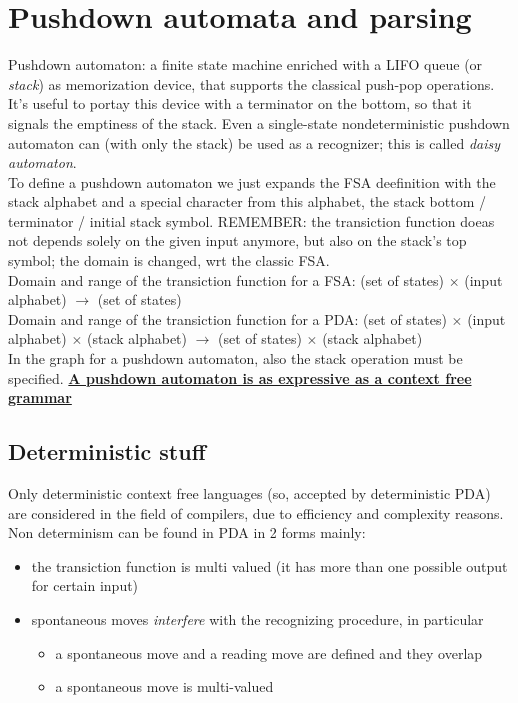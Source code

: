 \chapter{Pushdown automata and parsing}
	Pushdown automaton: a finite state machine enriched with a LIFO queue (or \emph{stack}) as memorization device, that supports the classical push-pop operations. It's useful to portay this device with a terminator on the bottom, so that it signals the emptiness of the stack. Even a single-state nondeterministic pushdown automaton can (with only the stack) be used as a recognizer; this is called \emph{daisy automaton}.\\
	To define a pushdown automaton we just expands the FSA deefinition with the stack alphabet and a special character from this alphabet, the stack bottom / terminator / initial stack symbol. REMEMBER: the transiction function doeas not depends solely on the given input anymore, but also on the stack's top symbol; the domain is changed, wrt the classic FSA.\\
	Domain and range of the transiction function for a FSA: (set of states) $\times$ (input alphabet) $\rightarrow$ (set of states)\\
	Domain and range of the transiction function for a PDA: (set of states) $\times$ (input alphabet) $\times$ (stack alphabet) $\rightarrow$ (set of states) $\times$ (stack alphabet)\\
	In the graph for a pushdown automaton, also the stack operation must be specified.
	\textbf{\underline{A pushdown automaton is as expressive as a context free grammar}}
	
	\section{Deterministic stuff}
		Only deterministic context free languages (so, accepted by deterministic PDA) are considered in the field of compilers, due to efficiency and complexity reasons.\\
		Non determinism can be found in PDA in 2 forms mainly:
		\begin{itemize}
			\item the transiction function is multi valued (it has more than one possible output for certain input)
			\item spontaneous moves \emph{interfere} with the recognizing procedure, in particular
				\begin{itemize}
					\item a spontaneous move and a reading move are defined and they overlap
					\item a spontaneous move is multi-valued
				\end{itemize}
		\end{itemize}
		
